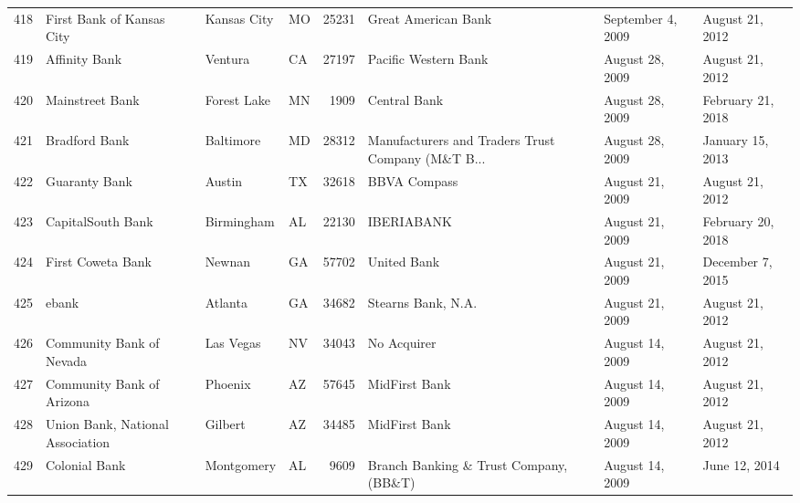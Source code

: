 \begin{tabular}{llllrlll}
418 &                          First Bank of Kansas City &         Kansas City &  MO &  25231 &                                Great American Bank &   September 4, 2009 &     August 21, 2012 \\
419 &                                      Affinity Bank &             Ventura &  CA &  27197 &                               Pacific Western Bank &     August 28, 2009 &     August 21, 2012 \\
420 &                                    Mainstreet Bank &         Forest Lake &  MN &   1909 &                                       Central Bank &     August 28, 2009 &   February 21, 2018 \\
421 &                                      Bradford Bank &           Baltimore &  MD &  28312 &  Manufacturers and Traders Trust Company (M\&T B... &     August 28, 2009 &    January 15, 2013 \\
422 &                                      Guaranty Bank &              Austin &  TX &  32618 &                                       BBVA Compass &     August 21, 2009 &     August 21, 2012 \\
423 &                                  CapitalSouth Bank &          Birmingham &  AL &  22130 &                                         IBERIABANK &     August 21, 2009 &   February 20, 2018 \\
424 &                                  First Coweta Bank &              Newnan &  GA &  57702 &                                        United Bank &     August 21, 2009 &    December 7, 2015 \\
425 &                                              ebank &             Atlanta &  GA &  34682 &                                 Stearns Bank, N.A. &     August 21, 2009 &     August 21, 2012 \\
426 &                           Community Bank of Nevada &           Las Vegas &  NV &  34043 &                                        No Acquirer &     August 14, 2009 &     August 21, 2012 \\
427 &                          Community Bank of Arizona &             Phoenix &  AZ &  57645 &                                      MidFirst Bank &     August 14, 2009 &     August 21, 2012 \\
428 &                   Union Bank, National Association &             Gilbert &  AZ &  34485 &                                      MidFirst Bank &     August 14, 2009 &     August 21, 2012 \\
429 &                                      Colonial Bank &          Montgomery &  AL &   9609 &             Branch Banking \& Trust Company, (BB\&T) &     August 14, 2009 &       June 12, 2014 \\

\end{tabular}
